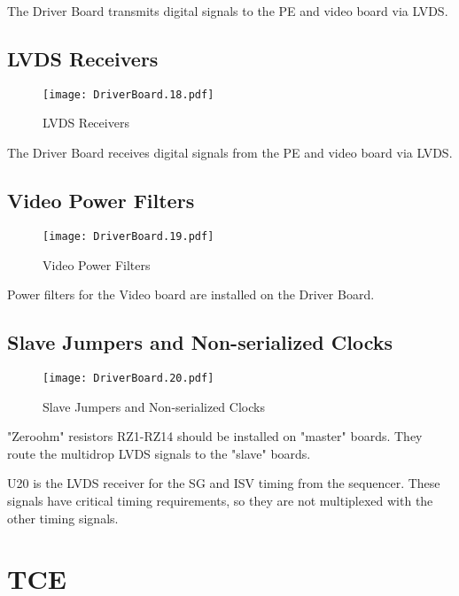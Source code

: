 The Driver Board transmits digital signals to the PE and video board via LVDS.


\subsection{LVDS Receivers}
   \begin{figure}
   \begin{center}
   \texttt{[image: DriverBoard.18.pdf]}
   \end{center}
   \caption{LVDS Receivers}
   \end{figure}

The Driver Board receives digital signals from the PE and video board via LVDS.



\subsection{Video Power Filters}
   \begin{figure}
   \begin{center}
   \texttt{[image: DriverBoard.19.pdf]}
   \end{center}
   \caption{Video Power Filters}
   \end{figure}

Power filters for the Video board are installed on the Driver Board.

\subsection{Slave Jumpers and Non-serialized Clocks}
   \begin{figure}
   \begin{center}
   \texttt{[image: DriverBoard.20.pdf]}
   \end{center}
   \caption{Slave Jumpers and Non-serialized Clocks}
   \end{figure}

"Zeroohm" resistors RZ1-RZ14 should be installed on "master" boards. They route the multidrop LVDS signals to the "slave" boards.

U20 is the LVDS receiver for the SG and ISV timing from the sequencer. These signals have critical timing requirements, so they are not multiplexed with the other timing signals.


\section{TCE}

